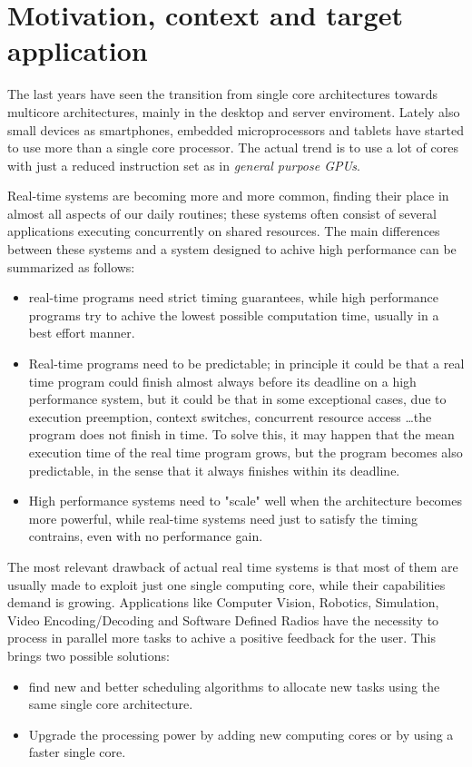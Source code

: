 \documentclass[a4paper,12pt,oneside]{book}
\begin{document}
\section{Motivation, context and target application}

The last years have seen the transition from single core architectures towards multicore architectures, mainly in the desktop and server enviroment. Lately also small devices as smartphones, embedded microprocessors and tablets have started to use more than a single core processor. The actual trend is to use a lot of cores with just a reduced instruction set as in \emph{general purpose GPUs}.

Real-time systems are becoming more and more common, finding their place in almost all aspects of our daily routines; these systems often consist of several applications executing concurrently on shared resources. 
The main differences between these systems and a system designed to achive high performance can be summarized as follows:
\begin{itemize}
\item{ real-time programs need strict timing guarantees, while high performance programs try to achive the lowest possible computation time, usually in a best effort manner.}
\item{Real-time programs need to be predictable; in principle it could be that a real time program could finish almost always before its deadline on a high performance system, but it could be that in some exceptional cases, due to execution preemption, context switches, concurrent resource access \dots the program does not finish in time. To solve this, it may happen that the mean execution time of the real time program grows, but the program becomes also predictable, in the sense that it always finishes within its deadline.}
\item{ High performance systems need to "scale" well when the architecture becomes more powerful, while real-time systems need just to satisfy the timing contrains, even with no performance gain.}

\end{itemize}

The most relevant drawback of actual real time systems is that most of them are usually made to exploit just one single computing core, while their capabilities demand is growing. Applications like Computer Vision, Robotics, Simulation, Video Encoding/Decoding and Software Defined Radios have the necessity to process in parallel more tasks to achive a positive feedback for the user. This brings two possible solutions:
\begin{itemize}
\item{find new and better scheduling algorithms to allocate new tasks using the same single core architecture.}
\item{Upgrade the processing power by adding new computing cores or by using a faster single core.}
\end{itemize}
\end{document}
